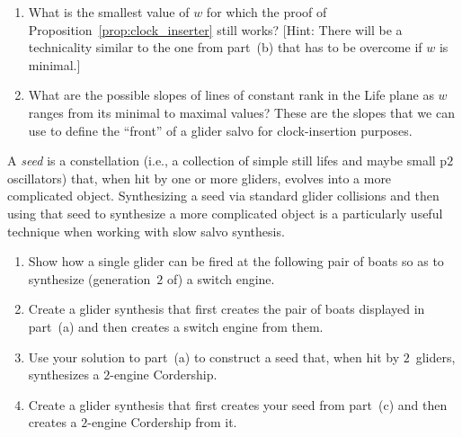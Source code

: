 \begin{multicols}{2}
\begin{problem}
\begin{enumerate}[label=(\alph*)]
		\item What is the smallest value of $w$ for which the proof of Proposition~\ref{prop:clock_inserter} still works? [Hint: There will be a technicality similar to the one from part~(b) that has to be overcome if $w$ is minimal.]
		
		\item What are the possible slopes of lines of constant rank in the Life plane as $w$ ranges from its minimal to maximal values? These are the slopes that we can use to define the ``front'' of a glider salvo for clock-insertion purposes.
	\end{enumerate}
\end{problem}


\mfilbreak


\begin{problem}\label{exer:2_engine_corder_seed}
	A \emph{seed} is a constellation (i.e., a collection of simple still lifes and maybe small p$2$ oscillators) that, when hit by one or more gliders, evolves into a more complicated object. Synthesizing a seed via standard glider collisions and then using that seed to synthesize a more complicated object is a particularly useful technique when working with slow salvo synthesis.
	\begin{enumerate}[label=(\alph*)]
		\item Show how a single glider can be fired at the following pair of boats so as to synthesize (generation~$2$ of) a switch engine.
		\begin{center}
		\end{center}
		
		
		\item Create a glider synthesis that first creates the pair of boats displayed in part~(a) and then creates a switch engine from them.
		
		\item Use your solution to part~(a) to construct a seed that, when hit by $2$~gliders, synthesizes a $2$-engine Cordership.
		
		\item Create a glider synthesis that first creates your seed from part~(c) and then creates a $2$-engine Cordership from it.
	\end{enumerate}
\end{problem}

\end{multicols}
\normalsize\vspace*{0.01cm}
